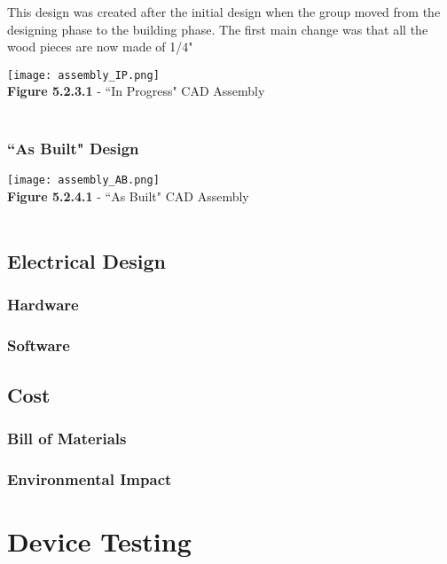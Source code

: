 \documentclass{article}
\begin{document}
This design was created after the initial design when the group moved from the designing phase to the building phase. The first main change was that all the wood pieces are now made of 1/4"

\begin{center}
    \texttt{[image: assembly\_IP.png]}\\
    \small{\textbf{Figure 5.2.3.1} - ``In Progress" CAD Assembly}\\~\\
\end{center}

\subsubsection{``As Built" Design}



\begin{center}
    \texttt{[image: assembly\_AB.png]}\\
    \small{\textbf{Figure 5.2.4.1} - ``As Built" CAD Assembly}\\~\\
\end{center}

\subsection{Electrical Design}
\subsubsection{Hardware}
\subsubsection{Software}

\subsection{Cost}
\subsubsection{Bill of Materials}
\subsubsection{Environmental Impact}

\newpage
\section{Device Testing}
\end{document}

